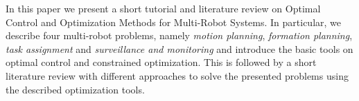 In this paper we present a short tutorial and literature review on Optimal Control and Optimization Methods for Multi-Robot Systems. In particular, we describe four multi-robot problems, namely \emph{motion planning}, \emph{formation planning}, \emph{task assignment} and \emph{surveillance and monitoring} and introduce the basic tools on optimal control and constrained optimization. This is followed by a short literature review with different approaches to solve the presented problems using the described optimization tools.